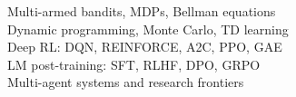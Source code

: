 \documentclass[oneside,openany]{book}
\theoremstyle{definition}
\theoremstyle{plain}
\theoremstyle{remark}
\begin{document}
\begin{titlepage}
\begin{flushleft}
    {\fontsize{9pt}{12pt}\selectfont
     \par}
    \vspace{8pt}

    {\fontsize{10.5pt}{17pt}\selectfont
     \noindent\textbullet\ Multi-armed bandits, MDPs, Bellman equations\\
     \textbullet\ Dynamic programming, Monte Carlo, TD learning\\
     \textbullet\ Deep RL: DQN, REINFORCE, A2C, PPO, GAE\\
     \textbullet\ LM post-training: SFT, RLHF, DPO, GRPO\\
     \textbullet\ Multi-agent systems and research frontiers\par}

    \vspace*{\fill}

    \noindent
    {\fontsize{8.5pt}{11pt}\selectfont
     \textbf{}\par}
    \vspace{2pt}
    {\fontsize{8pt}{11pt}\selectfont
     \par}
    \vspace{6pt}
    {\fontsize{8pt}{11pt}\selectfont
     \par}

  \end{flushleft}
  \restoregeometry
\end{titlepage}

\color{black}\rmfamily
\end{document}
